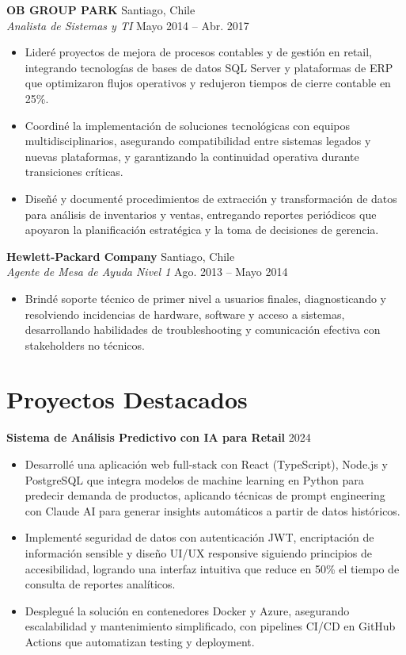 \documentclass[11pt,letterpaper]{article}
\begin{document}
\vspace{2pt}
\textbf{OB GROUP PARK} \hfill Santiago, Chile\\
\textit{Analista de Sistemas y TI} \hfill Mayo 2014 – Abr. 2017
\begin{itemize}
  \item Lideré proyectos de mejora de procesos contables y de gestión en retail, integrando tecnologías de bases de datos SQL Server y plataformas de ERP que optimizaron flujos operativos y redujeron tiempos de cierre contable en 25\%.
  \item Coordiné la implementación de soluciones tecnológicas con equipos multidisciplinarios, asegurando compatibilidad entre sistemas legados y nuevas plataformas, y garantizando la continuidad operativa durante transiciones críticas.
  \item Diseñé y documenté procedimientos de extracción y transformación de datos para análisis de inventarios y ventas, entregando reportes periódicos que apoyaron la planificación estratégica y la toma de decisiones de gerencia.
\end{itemize}
\vspace{2pt}
\textbf{Hewlett-Packard Company} \hfill Santiago, Chile\\
\textit{Agente de Mesa de Ayuda Nivel 1} \hfill Ago. 2013 – Mayo 2014
\begin{itemize}
  \item Brindé soporte técnico de primer nivel a usuarios finales, diagnosticando y resolviendo incidencias de hardware, software y acceso a sistemas, desarrollando habilidades de troubleshooting y comunicación efectiva con stakeholders no técnicos.
\end{itemize}

\section{Proyectos Destacados}

\textbf{Sistema de Análisis Predictivo con IA para Retail} \hfill 2024
\begin{itemize}
  \item Desarrollé una aplicación web full-stack con React (TypeScript), Node.js y PostgreSQL que integra modelos de machine learning en Python para predecir demanda de productos, aplicando técnicas de prompt engineering con Claude AI para generar insights automáticos a partir de datos históricos.
  \item Implementé seguridad de datos con autenticación JWT, encriptación de información sensible y diseño UI/UX responsive siguiendo principios de accesibilidad, logrando una interfaz intuitiva que reduce en 50\% el tiempo de consulta de reportes analíticos.
  \item Desplegué la solución en contenedores Docker y Azure, asegurando escalabilidad y mantenimiento simplificado, con pipelines CI/CD en GitHub Actions que automatizan testing y deployment.
\end{itemize}
\end{document}
